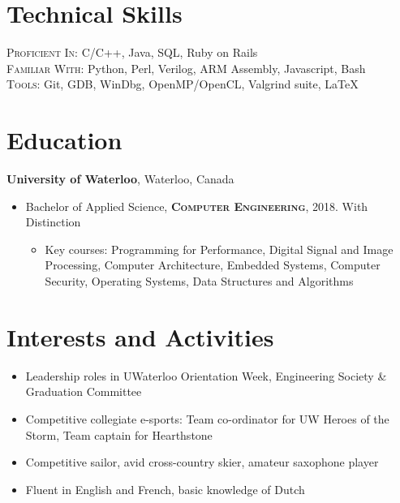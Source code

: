\documentclass[a4paper,10pt]{article}
\begin{document}
\begin{minipage}[t]{0.33\textwidth}


\section{Technical Skills}

\textsc{Proficient In:} C/C++, Java, SQL, Ruby on Rails \\
\textsc{Familiar With:} Python, Perl, Verilog, ARM Assembly, Javascript, Bash \\
 \textsc{Tools:} Git, GDB, WinDbg, OpenMP/OpenCL, Valgrind suite, \LaTeX \\



\section{Education}
\textbf{University of Waterloo}, Waterloo, Canada
\begin{itemize}
    \item{Bachelor of Applied Science, \textsc{\textbf{Computer Engineering}}, 2018. With Distinction}
    \begin{itemize}
        \item {\footnotesize{Key courses: Programming for Performance, Digital Signal and Image Processing, Computer Architecture, Embedded Systems, Computer Security, Operating Systems, Data Structures and Algorithms}}
    \end{itemize}
\end{itemize}

\section{Interests and Activities}
\begin{itemize}
	\item {Leadership roles in UWaterloo Orientation Week, Engineering Society \& Graduation Committee}
	\item {Competitive collegiate e-sports: Team co-ordinator for UW Heroes of the Storm, Team captain for Hearthstone}
	\item {Competitive sailor, avid cross-country skier, amateur saxophone player}
    \item {Fluent in English and French, basic knowledge of Dutch}
\end{itemize}


\end{minipage}
\end{document}
